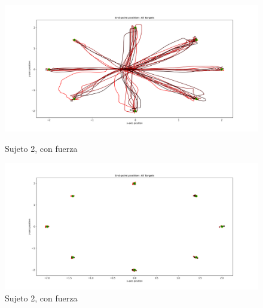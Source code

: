 \documentclass[a4paper,11pt, oneside]{book}
\begin{document}
\begin{figure}[H]
	\begin{minipage}[b]{0.5\linewidth}
		\centering
		\includegraphics[width=\linewidth]{sujeto2/force/trayectorias}
		\caption{Sujeto 2, con fuerza}
		\label{fig:figura1}
	\end{minipage}
	\hspace{0.5cm}
	\begin{minipage}[b]{0.5\linewidth}
		\centering
		\includegraphics[width=\linewidth]{sujeto2/force/trayectorias_puntos}
		\caption{Sujeto 2, con fuerza}
		\label{fig:figura2}
	\end{minipage}
\end{figure}
\end{document}
